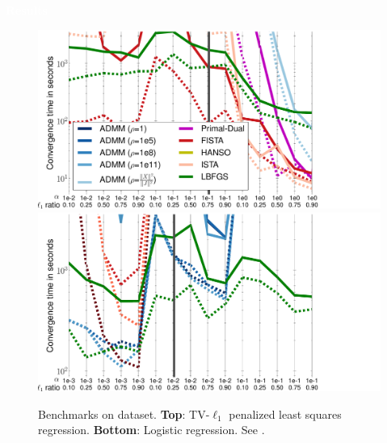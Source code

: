 \documentclass[french]{STIC_poster}
\begin{document}
\begin{frame}[t]
\begin{columns}[t]
\begin{column}{.48\linewidth}
\begin{abox}{\textbf{\textcolor{white}{Results}}}
                            \begin{figure}
                              \includegraphics[width=1.2\linewidth]{bench/haxby_mse.pdf}%
                              \hspace{-.09\linewidth}%
                              \includegraphics[width=1.2\linewidth]{bench/haxby_lr.pdf}
                              \caption{Benchmarks on \textcolor{cyan}{\cite{haxby2001}} dataset. \textbf{Top}: TV-$\ell_1$ penalized least squares regression.
                                \textbf{Bottom}: Logistic regression. See \textcolor{cyan}{\cite{dohmatob2014benchmarking}}.}
                              \label{Fig:MSEtimes}
                            \end{figure}

\end{abox}
\end{column}
\end{columns}
\end{frame}
\end{document}
